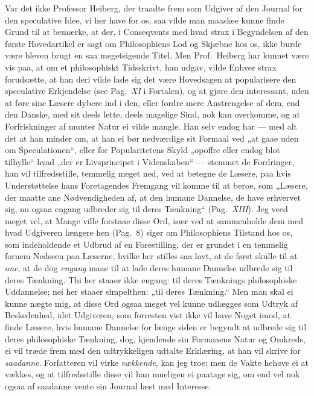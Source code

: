 \documentclass[12pt,a4paper]{book}
\newcommand{\apage}[1]{\marginnote{\footnotesize\textit{[#1]}}}
\begin{document}
\apage{1} Var det ikke Professor Heiberg, der traadte frem som Udgiver af den
Journal for den speculative Idee, vi her have for os, saa vilde man
maaskee kunne finde Grund til at bemærke, at der, i Conseqvents med hvad
strax i Begyndelsen af den første Hovedartikel er sagt om Philosophiens
Lod og Skjæbne hos os, ikke burde være bleven brugt en saa megetsigende
Titel. Men Prof.\ Heiberg har kunnet være vis paa, at om et philosophiskt
Tidsskrivt, han udgav, vilde Enhver strax forudsætte, at han deri vilde
lade sig det være Hovedsagen at popularisere den speculative Erkjendelse
(see Pag.\ \textit{XI} i Fortalen), og at gjøre den interessant, uden at
føre sine Læsere dybere ind i den, eller fordre mere Anstrengelse af dem,
end den Danske, med sit deels lette, deels magelige Sind, nok kan
overkomme, og at Forfriskninger af munter Natur ei vilde mangle. Han selv
endog har --- med alt det at han minder om, at han ei bør nedværdige sit
Formaal ved „at gaae uden om Speculationen“, eller for Popularitetens
Skyld „opoffre eller endog blot tilhylle“ hvad „der er Livsprincipet i
Videnskaben“ --- stemmet de Fordringer, han vil tilfredsstille, temmelig
meget ned, ved at betegne de Læsere, paa hvis Understøttelse hans
Foretagendes Fremgang vil komme til at beroe, som „Læsere, der maatte ane
Nødvendigheden af, at den humane Dannelse, de have erhvervet sig, nu ogsaa
engang udbreder sig til deres Tænkning“ \apage{2}
(Pag.\ \textit{XIII}). Jeg veed meget vel, at Mange ville forstaae disse
Ord, især ved at sammenholde dem med hvad Udgiveren længere hen
(Pag.\ 8) siger om Philosophiens Tilstand hos os, som indeholdende et
Udbrud af en Forestilling, der er grundet i en temmelig fornem Nedseen
paa Læserne, hvilke her stilles saa lavt, at de først skulle til at \emph{ane},
at de dog \emph{engang} maae til at lade deres humane Dannelse udbrede sig til
deres Tænkning. Thi her staaer ikke engang: til deres Tænknings
philosophiske Uddannelse; nei her staaer simpelthen: „til deres
Tænkning.“ Men man skal ei kunne nægte mig, at disse Ord ogsaa meget vel
kunne udlægges som Udtryk af Beskedenhed, idet Udgiveren, som forresten
vist ikke vil have Noget imod, at finde Læsere, hvis humane Dannelse for
længe siden er begyndt at udbrede sig til deres philosophiske Tænkning,
dog, kjendende sin Formaaens Natur og Omkreds, ei vil træde frem med den
udtrykkeligen udtalte Erklæring, at han vil skrive for \emph{saadanne}.
Forfatteren vil virke \emph{vækkende}, kan jeg troe; men de Vakte hehøve ei at
vækkes, og at tilfredsstille disse vil han mueligen ei paatage sig, om
end vel nok ogsaa af saadanne vente sin Journal læst med Interesse.
\end{document}
